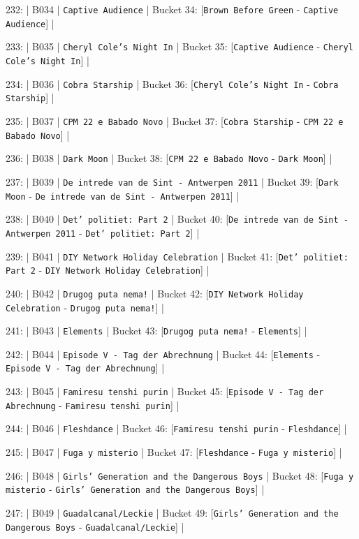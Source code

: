 \documentclass[11pt,a4paper]{article}
\begin{document}
{232: | B034 | \texttt{Captive Audience} | Bucket 34: [\texttt{Brown Before Green} - \texttt{Captive Audience}] |

233: | B035 | \texttt{Cheryl Cole's Night In} | Bucket 35: [\texttt{Captive Audience} - \texttt{Cheryl Cole's Night In}] |

234: | B036 | \texttt{Cobra Starship} | Bucket 36: [\texttt{Cheryl Cole's Night In} - \texttt{Cobra Starship}] |

235: | B037 | \texttt{CPM 22 e Babado Novo} | Bucket 37: [\texttt{Cobra Starship} - \texttt{CPM 22 e Babado Novo}] |

236: | B038 | \texttt{Dark Moon} | Bucket 38: [\texttt{CPM 22 e Babado Novo} - \texttt{Dark Moon}] |

237: | B039 | \texttt{De intrede van de Sint - Antwerpen 2011} | Bucket 39: [\texttt{Dark Moon} - \texttt{De intrede van de Sint - Antwerpen 2011}] |

238: | B040 | \texttt{Det' politiet: Part 2} | Bucket 40: [\texttt{De intrede van de Sint - Antwerpen 2011} - \texttt{Det' politiet: Part 2}] |

239: | B041 | \texttt{DIY Network Holiday Celebration} | Bucket 41: [\texttt{Det' politiet: Part 2} - \texttt{DIY Network Holiday Celebration}] |

240: | B042 | \texttt{Drugog puta nema!} | Bucket 42: [\texttt{DIY Network Holiday Celebration} - \texttt{Drugog puta nema!}] |

241: | B043 | \texttt{Elements} | Bucket 43: [\texttt{Drugog puta nema!} - \texttt{Elements}] |

242: | B044 | \texttt{Episode V - Tag der Abrechnung} | Bucket 44: [\texttt{Elements} - \texttt{Episode V - Tag der Abrechnung}] |

243: | B045 | \texttt{Famiresu tenshi purin} | Bucket 45: [\texttt{Episode V - Tag der Abrechnung} - \texttt{Famiresu tenshi purin}] |

244: | B046 | \texttt{Fleshdance} | Bucket 46: [\texttt{Famiresu tenshi purin} - \texttt{Fleshdance}] |

245: | B047 | \texttt{Fuga y misterio} | Bucket 47: [\texttt{Fleshdance} - \texttt{Fuga y misterio}] |

246: | B048 | \texttt{Girls' Generation and the Dangerous Boys} | Bucket 48: [\texttt{Fuga y misterio} - \texttt{Girls' Generation and the Dangerous Boys}] |

247: | B049 | \texttt{Guadalcanal/Leckie} | Bucket 49: [\texttt{Girls' Generation and the Dangerous Boys} - \texttt{Guadalcanal/Leckie}] |

}
\end{document}
